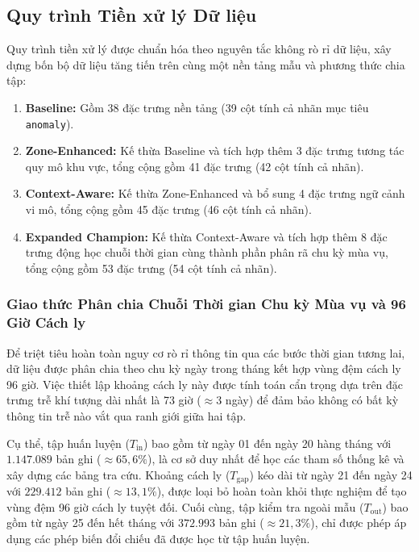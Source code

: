 \subsection{Quy trình Tiền xử lý Dữ liệu}

Quy trình tiền xử lý được chuẩn hóa theo nguyên tắc không rò rỉ dữ liệu, xây dựng bốn bộ dữ liệu tăng tiến trên cùng một nền tảng mẫu và phương thức chia tập:
\begin{enumerate}
    \item \textbf{Baseline:} Gồm 38 đặc trưng nền tảng (39 cột tính cả nhãn mục tiêu \texttt{anomaly}).
    \item \textbf{Zone-Enhanced:} Kế thừa Baseline và tích hợp thêm 3 đặc trưng tương tác quy mô khu vực, tổng cộng gồm 41 đặc trưng (42 cột tính cả nhãn).
    \item \textbf{Context-Aware:} Kế thừa Zone-Enhanced và bổ sung 4 đặc trưng ngữ cảnh vi mô, tổng cộng gồm 45 đặc trưng (46 cột tính cả nhãn).
    \item \textbf{Expanded Champion:} Kế thừa Context-Aware và tích hợp thêm 8 đặc trưng động học chuỗi thời gian cùng thành phần phân rã chu kỳ mùa vụ, tổng cộng gồm 53 đặc trưng (54 cột tính cả nhãn).
\end{enumerate}

\subsubsection{Giao thức Phân chia Chuỗi Thời gian Chu kỳ Mùa vụ và 96 Giờ Cách ly}

Để triệt tiêu hoàn toàn nguy cơ rò rỉ thông tin qua các bước thời gian tương lai, dữ liệu được phân chia theo chu kỳ ngày trong tháng kết hợp vùng đệm cách ly 96 giờ. Việc thiết lập khoảng cách ly này được tính toán cẩn trọng dựa trên đặc trưng trễ khí tượng dài nhất là 73 giờ ($\approx 3$ ngày) để đảm bảo không có bất kỳ thông tin trễ nào vắt qua ranh giới giữa hai tập.

Cụ thể, tập huấn luyện ($T_{\text{in}}$) bao gồm từ ngày 01 đến ngày 20 hàng tháng với $1.147.089$ bản ghi ($\approx 65{,}6\%$), là cơ sở duy nhất để học các tham số thống kê và xây dựng các bảng tra cứu. Khoảng cách ly ($T_{\text{gap}}$) kéo dài từ ngày 21 đến ngày 24 với $229.412$ bản ghi ($\approx 13{,}1\%$), được loại bỏ hoàn toàn khỏi thực nghiệm để tạo vùng đệm 96 giờ cách ly tuyệt đối. Cuối cùng, tập kiểm tra ngoài mẫu ($T_{\text{out}}$) bao gồm từ ngày 25 đến hết tháng với $372.993$ bản ghi ($\approx 21{,}3\%$), chỉ được phép áp dụng các phép biến đổi chiếu đã được học từ tập huấn luyện.

